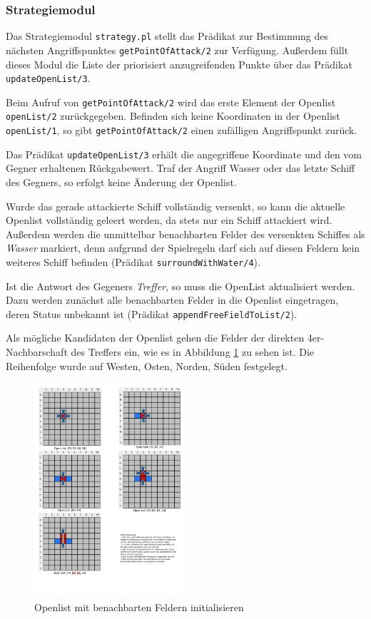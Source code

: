 \subsubsection{Strategiemodul} \label{sec:strategy}

Das Strategiemodul \texttt{strategy.pl} stellt das Prädikat zur Bestimmung des nächsten Angriffspunktes \texttt{getPointOfAttack/2}	zur Verfügung. 
Außerdem füllt dieses Modul die Liste der priorisiert anzugreifenden Punkte über das Prädikat \texttt{updateOpenList/3}. 

Beim Aufruf von \texttt{getPointOfAttack/2} wird das erste Element der Openlist \texttt{openList/2} zurückgegeben.
Befinden sich keine Koordinaten in der Openlist \texttt{openList/1}, so gibt \texttt{getPointOfAttack/2} einen zufälligen Angriffspunkt zurück.

Das Prädikat \texttt{updateOpenList/3} erhält die angegriffene Koordinate und den vom Gegner erhaltenen Rückgabewert. 
Traf der Angriff Wasser oder das letzte Schiff des Gegners, so erfolgt keine Änderung der Openlist.

Wurde das gerade attackierte Schiff vollständig versenkt, so kann die aktuelle Openlist vollständig geleert werden, da stets nur ein Schiff attackiert wird. 
Außerdem werden die unmittelbar benachbarten Felder des versenkten Schiffes als \textit{Wasser} markiert, denn aufgrund der Spielregeln darf sich auf diesen Feldern kein weiteres Schiff befinden (Prädikat \texttt{surroundWithWater/4}). 

Ist die Antwort des Gegeners \textit{Treffer}, so muss die OpenList aktualisiert werden. 
Dazu werden zunächst alle benachbarten Felder in die Openlist eingetragen, deren Status unbekannt ist (Prädikat \texttt{appendFreeFieldToList/2}). 

Als mögliche Kandidaten der Openlist gehen die Felder der direkten 4er-Nachbarschaft des Treffers ein, wie es in Abbildung \ref{fig:ErstelleOpenlist} zu sehen ist.
Die Reihenfolge wurde auf Westen, Osten, Norden, Süden festgelegt.
\begin{figure}[H]
  \centering
  \includegraphics[trim=5mm 204mm 105mm 4mm,clip,width=0.5\textwidth]{images/Strategie_1_FirstHit.pdf}
  \caption{Openlist mit benachbarten Feldern initialisieren}
  \label{fig:ErstelleOpenlist}
\end{figure}

